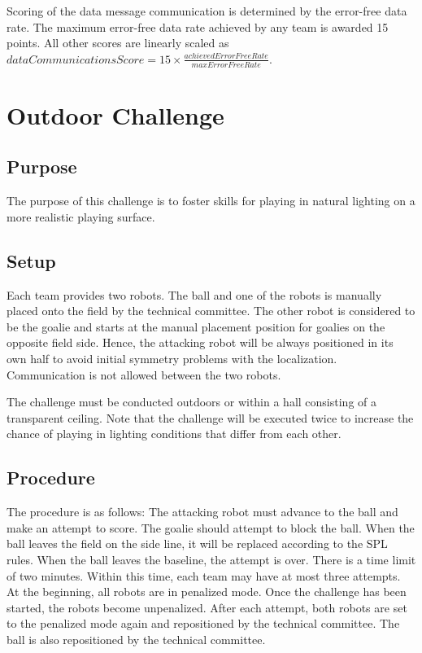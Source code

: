 \documentclass[12pt]{article}
\begin{document}
Scoring of the data message communication is determined by the error-free data rate. The maximum error-free data rate achieved by any team is awarded 15 points. All other scores are linearly scaled as $dataCommunicationsScore = 15 \times \frac{achievedErrorFreeRate}{maxErrorFreeRate}$. 

\newpage



\section{Outdoor Challenge}

\subsection{Purpose}
The purpose of this challenge is to foster skills for playing in natural lighting on a more realistic playing surface.

\subsection{Setup}
Each team provides two robots. The ball and one of the robots is manually placed onto the field by the technical committee. The other robot is considered to be the goalie and starts at the manual placement position for goalies on the opposite field side. Hence, the attacking robot will be always positioned in its own half to avoid initial symmetry problems with the localization. Communication is not allowed between the two robots.

The challenge must be conducted outdoors or within a hall consisting of a transparent ceiling. Note that the challenge will be executed twice to increase the chance of playing in lighting conditions that differ from each other.

\subsection{Procedure}
The procedure is as follows: The attacking robot must advance to the ball and make an attempt to score. The goalie should attempt to block the ball. When the ball leaves the field on the side line, it will be replaced according to the SPL rules. When the ball leaves the baseline, the attempt is over. There is a time limit of two minutes. Within this time, each team may have at most three attempts. At the beginning, all robots are in penalized mode. Once the challenge has been started, the robots become unpenalized. After each attempt, both robots are set to the penalized mode again and repositioned by the technical committee.  The ball is also repositioned by the technical committee.
\end{document}
